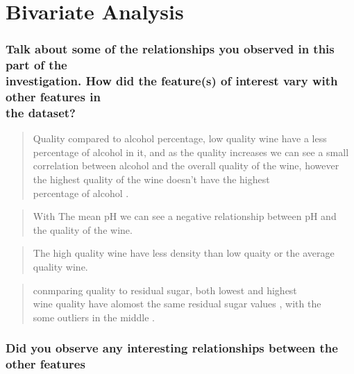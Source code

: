 \documentclass[]{article}
\begin{document}
\section{Bivariate Analysis}\label{bivariate-analysis}

\subsubsection{\texorpdfstring{Talk about some of the relationships you
observed in this part of the\\
investigation. How did the feature(s) of interest vary with other
features in\\
the
dataset?}{Talk about some of the relationships you observed in this part of the investigation. How did the feature(s) of interest vary with other features in the dataset?}}\label{talk-about-some-of-the-relationships-you-observed-in-this-part-of-the-investigation.-how-did-the-features-of-interest-vary-with-other-features-in-the-dataset}

\begin{quote}
Quality compared to alcohol percentage, low quality wine have a less\\
percentage of alcohol in it, and as the quality increases we can see a
small\\
correlation between alcohol and the overall quality of the wine,
however\\
the highest quality of the wine doesn't have the highest\\
percentage of alcohol .
\end{quote}

\begin{quote}
With The mean pH we can see a negative relationship between pH and\\
the quality of the wine.
\end{quote}

\begin{quote}
The high quality wine have less density than low quaity or the average
quality wine.
\end{quote}

\begin{quote}
conmparing quality to residual sugar, both lowest and highest\\
wine quality have alomost the same residual sugar values , with the\\
some outliers in the middle .
\end{quote}

\subsubsection{\texorpdfstring{Did you observe any interesting
relationships between the other features\\
}{Did you observe any interesting relationships between the other features }}\label{did-you-observe-any-interesting-relationships-between-the-other-features}
\end{document}
